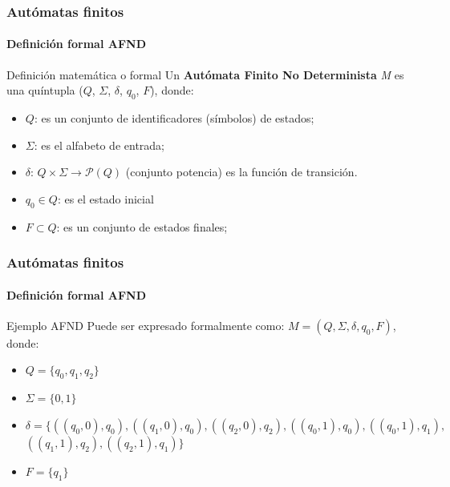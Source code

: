 \documentclass{beamer}
\begin{document}
        \begin{frame}
			\frametitle{Aut\'omatas finitos}
			\framesubtitle{Definici\'on formal AFND}

            \begin{block}{Definici\'on matem\'atica o formal}
                 Un \textbf{Aut\'omata Finito No Determinista} \emph{M} es una qu\'intupla ($Q$, $\Sigma$, $\delta$, $q_{0}$, $F$), donde:
                \begin{itemize}
                    \item[] $Q$: es un conjunto de identificadores (s\'imbolos) de estados;
                    \item[] $\Sigma$: es el alfabeto de entrada;
                    \item[] $\delta$: $Q \times \Sigma \rightarrow \mathcal{P}(Q)$ (conjunto potencia) es la funci\'on de transici\'on.
                    \item[] $q_{0} \in Q$: es el estado inicial
                    \item[] $F \subset Q$: es un conjunto de estados finales;
                \end{itemize}
            \end{block}
		\end{frame}

        \begin{frame}
			\frametitle{Aut\'omatas finitos}
			\framesubtitle{Definici\'on formal AFND}

            \begin{exampleblock}{Ejemplo AFND}
               Puede ser expresado formalmente como: $M = (Q, \Sigma, \delta, q_{0}, F)$, donde:
               \begin{itemize}
                   \item[] $Q = \{q_{0},q_{1},q_{2}\}$
                   \item[] $\Sigma = \{0,1\}$
                   \item[] $\delta =  \{((q_{0}, 0),q_{0}),((q_{1}, 0),q_{0}),((q_{2}, 0),q_{2}),((q_{0}, 1),q_{0}),((q_{0}, 1),q_{1}),$ $((q_{1}, 1),q_{2}),((q_{2}, 1), q_{1})\}$
                   \item[] $F = \{q_{1}\}$
               \end{itemize}
            \end{exampleblock}
		\end{frame}
\end{document}
